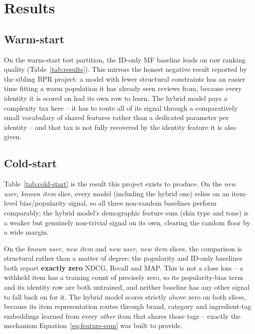 \section{Results}
\label{sec:results}

\subsection{Warm-start}



On the warm-start test partition, the ID-only MF baseline leads on raw
ranking quality (Table~\ref{tab:results}). This mirrors the honest negative
result reported by the sibling BPR project: a model with fewer structural
constraints has an easier time fitting a warm population it has already
seen reviews from, because every identity it is scored on had its own row to
learn. The hybrid model pays a complexity tax here -- it has to route all of
its signal through a comparatively small vocabulary of shared features
rather than a dedicated parameter per identity -- and that tax is not fully
recovered by the identity feature it is also given.

\subsection{Cold-start}



Table~\ref{tab:cold-start} is the result this project exists to produce. On
the \emph{new user, known item} slice, every model (including the hybrid
one) relies on an item-level bias/popularity signal, so all three
non-random baselines perform comparably; the hybrid model's demographic
feature sum (skin type and tone) is a weaker but genuinely non-trivial
signal on its own, clearing the random floor by a wide margin.

On the \emph{known user, new item} and \emph{new user, new item} slices, the
comparison is structural rather than a matter of degree: the popularity and
ID-only baselines both report \textbf{exactly zero} NDCG, Recall and MAP.
This is not a close loss -- a withheld item has a training count of
precisely zero, so its popularity-bias term and its identity row are both
untrained, and neither baseline has any other signal to fall back on for it.
The hybrid model scores strictly above zero on both slices, because its item
representation routes through brand, category and ingredient-tag embeddings
learned from every \emph{other} item that shares those tags -- exactly the
mechanism Equation~\ref{eq:feature-sum} was built to provide.

